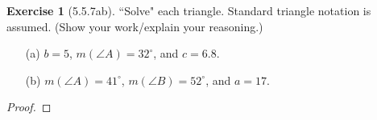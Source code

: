 \documentclass[11pt]{article}		%
\theoremstyle{definition}
\newtheorem*{ex}{Exercise}
\begin{document}
\vspace{1in} %





\begin{ex}[5.5.7ab]
	``Solve" each triangle.  Standard triangle notation is assumed.  (Show your work/explain your reasoning.)
	\begin{enumerate}
		\item[(a)] $b=5$, $m(\angle A) = 32^\circ$, and $c = 6.8$.
		\item[(b)] $m(\angle A) = 41^\circ$, $m(\angle B) = 52^\circ$, and $a = 17$.
	\end{enumerate}
	
\end{ex}

\begin{proof} 
	
\end{proof}
\end{document}

